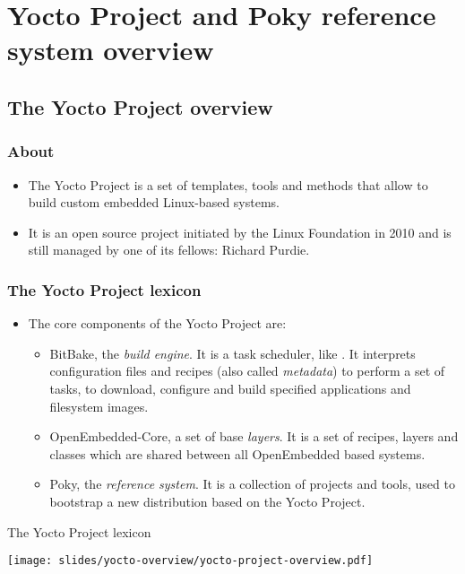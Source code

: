 \section{Yocto Project and Poky reference system overview}

\subsection{The Yocto Project overview}

\begin{frame}
  \frametitle{About}
  \begin{itemize}
  \item The Yocto Project is a set of templates, tools and methods
        that allow to build custom embedded Linux-based systems.
  \item It is an open source project initiated by the Linux Foundation
        in 2010 and is still managed by one of its fellows: Richard
        Purdie.
  \end{itemize}
\end{frame}

\begin{frame}
  \frametitle{The Yocto Project lexicon}
  \begin{itemize}
  \item The core components of the Yocto Project are:
    \begin{itemize}
      \item BitBake, the {\em build engine}. It is a task scheduler,
        like . It interprets configuration files and
        recipes (also called {\em metadata}) to perform a set of
        tasks, to download, configure and build specified applications
        and filesystem images.
      \item OpenEmbedded-Core, a set of base {\em layers}. It is a set
        of recipes, layers and classes which are shared between all
        OpenEmbedded based systems.
      \item Poky, the {\em reference system}. It is a collection of
        projects and tools, used to bootstrap a new distribution based
        on the Yocto Project.
    \end{itemize}
  \end{itemize}
\end{frame}

\begin{frame}{The Yocto Project lexicon}
  \begin{center}
    \texttt{[image: slides/yocto-overview/yocto-project-overview.pdf]}
  \end{center}
\end{frame}

